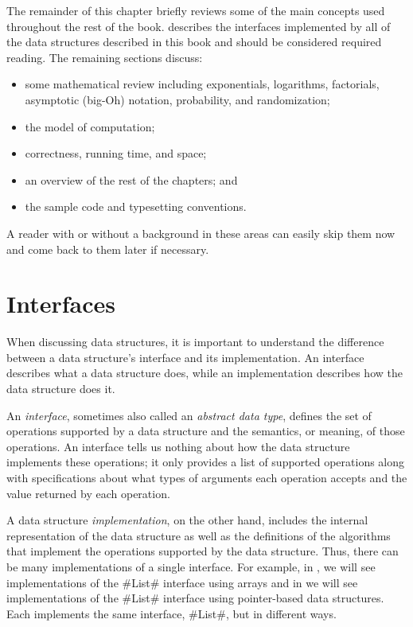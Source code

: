 The remainder of this chapter briefly reviews some of the main concepts
used throughout the rest of the book.    describes
the interfaces implemented by all of the data structures described in
this book and should be considered required reading.  The remaining
sections discuss:
\begin{itemize}
  \item some mathematical review including exponentials, logarithms,
  factorials, asymptotic (big-Oh) notation, probability, and randomization;
  \item the model of computation; 
  \item correctness, running time, and space;
  \item an overview of the rest of the chapters; and
  \item the sample code and typesetting conventions.
\end{itemize}
A reader with or without a background in these areas can easily skip
them now and come back to them later if necessary.


\section{Interfaces}
When discussing data structures, it is important to understand the
difference between a data structure's interface and its implementation.
An interface describes what a data structure does, while an implementation
describes how the data structure does it.

An \emph{interface},
%
%
sometimes also called an \emph{abstract data
type}, defines the set of operations supported by a data structure and
the semantics, or meaning, of those operations.  An interface tells us
nothing about how the data structure implements these operations; it only
provides a list of supported operations along with specifications about
what types of arguments each operation accepts and the value returned
by each operation.

A data structure \emph{implementation}, on the other hand, includes the
internal representation of the data structure as well as the definitions
of the algorithms that implement the operations supported by the data
structure.  Thus, there can be many implementations of a single interface.
For example, in , we will see implementations of the
#List# interface using arrays and in  we will
see implementations of the #List# interface using pointer-based data
structures.  Each implements the same interface, #List#,
but in different ways.


